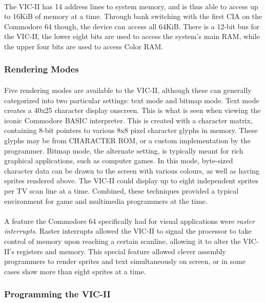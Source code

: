 \documentclass{article}
\begin{document}
\paragraph{}
The VIC-II has 14 address lines to system memory, and is thus able to access up to 16KiB of memory at a time. Through bank switching with the first CIA on the Commodore 64 though, the device can access all 64KiB. There is a 12-bit bus for the VIC-II, the lower eight bits are used to access the system's main RAM, while the upper four bits are used to access Color RAM. 

\subsubsection{Rendering Modes}
\paragraph{}
Five rendering modes are available to the VIC-II, although these can generally categorized into two particular settings: text mode and bitmap mode. Text mode creates a 40x25 character display onscreen. This is what is seen when viewing the iconic Commodore BASIC interpreter. This is created with a character matrix, containing 8-bit pointers to various 8x8 pixel character glyphs in memory. These glyphs may be from CHARACTER ROM, or a custom implementation by the programmer. Bitmap mode, the alternate setting, is typically meant for rich graphical applications, such as computer games. In this mode, byte-sized character data can be drawn to the screen with various colours, as well as having sprites rendered above. The VIC-II could display up to eight independent sprites per TV scan line at a time. Combined, these techniques provided a typical environment for game and multimedia programmers at the time.

\paragraph{}
A feature the Commodore 64 specifically had for visual applications were \textit{raster interrupts}. Raster interrupts allowed the VIC-II to signal the processor to take control of memory upon reaching a certain scanline, allowing it to alter the VIC-II's registers and memory. This special feature allowed clever assembly programmers to render sprites and text simultaneously on screen, or in some cases show more than eight sprites at a time.

\subsubsection{Programming the VIC-II}
\end{document}
